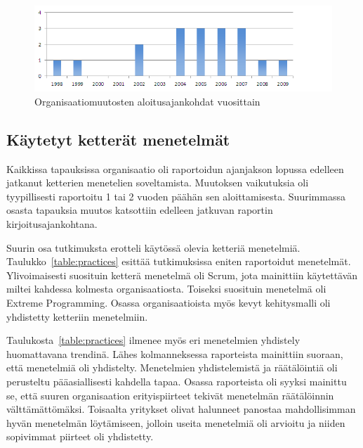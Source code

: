 \begin{figure}[htb]
  \begin{center}
    \includegraphics[width=1\textwidth]{img/Transformation_start}
    \caption{Organisaatiomuutosten aloitusajankohdat vuosittain}
    \label{fig:start_year}
  \end{center}
\end{figure}

\subsection{Käytetyt ketterät menetelmät}

Kaikkissa tapauksissa organisaatio oli raportoidun ajanjakson lopussa edelleen
jatkanut ketterien menetelien soveltamista. Muutoksen vaikutuksia oli
tyypillisesti raportoitu 1 tai 2 vuoden päähän sen aloittamisesta. Suurimmassa
osasta tapauksia muutos katsottiin edelleen jatkuvan raportin
kirjoitusajankohtana.

Suurin osa tutkimuksta erotteli käytössä olevia ketteriä menetelmiä.
Taulukko~\ref{table:practices} esittää tutkimuksissa eniten raportoidut
menetelmät. Ylivoimaisesti suosituin ketterä menetelmä oli Scrum, jota
mainittiin käytettävän miltei kahdessa kolmesta organisaatiosta. Toiseksi
suosituin menetelmä oli Extreme Programming. Osassa organisaatioista myös kevyt
kehitysmalli oli yhdistetty ketteriin menetelmiin.

Taulukosta~\ref{table:practices} ilmenee myös eri menetelmien yhdistely
huomattavana trendinä. Lähes kolmanneksessa raporteista mainittiin suoraan, että
menetelmiä oli yhdistelty. Menetelmien yhdistelemistä ja räätälöintiä oli
perusteltu pääasiallisesti kahdella tapaa. Osassa raporteista oli syyksi
mainittu se, että suuren organisaation erityispiirteet tekivät menetelmän
räätälöinnin välttämättömäksi. Toisaalta yritykset olivat halunneet panostaa
mahdollisimman hyvän menetelmän löytämiseen, jolloin useita menetelmiä oli
arvioitu ja niiden sopivimmat piirteet oli yhdistetty.

